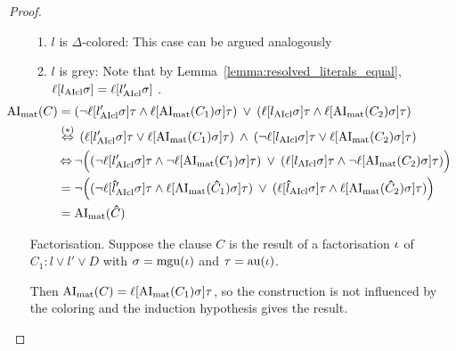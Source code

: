 \documentclass[,%
	draft=false,%
	numbers=noendperiod
	11pt,
	a4paper,
	oneside,%
	openany,
]{memoir}
\begin{document}
\begin{proof}
\begin{itemize}
\begin{enumerate}
				\item $l$ is $\Delta$-colored:
					This case can be argued analogously

				\item $l$ is grey:
					Note that by Lemma~\ref{lemma:resolved_literals_equal}, $\ell[l_{\operatorname{AIcl}}\sigma] = \ell[l'_{\operatorname{AIcl}}\sigma]$ \markB.
					\begin{align*}
						\hspace*{\dimexpr-\leftmargini-\leftmarginii}
						\AImat(C) &=
						(\lnot {\lifboth{l'\fromclause\sigma}}\tau \land \lifboth{\AImat(C_1)\sigma}\tau) \spam\lor 
						(\lifboth{l\fromclause\sigma}\tau \land \lifboth{\AImat(C_2)\sigma}\tau)\\
						&\stackrel{\markB}{\semiff}\,
						({\lifboth{l'\fromclause\sigma}}\tau \lor \lifboth{\AImat(C_1)\sigma}\tau) \spam\land 
						(\lnot \lifboth{l\fromclause\sigma}\tau \lor \lifboth{\AImat(C_2)\sigma}\tau)\\
						&\semiff \lnot \Big( (\lnot {\lifboth{l'\fromclause\sigma}}\tau \land \lnot \lifboth{\AImat(C_1)\sigma}\tau) \spam\lor 
						(\lifboth{l\fromclause\sigma}\tau \land \lnot\lifboth{\AImat(C_2)\sigma}\tau) \Big) \\
						&=\lnot \Big( (\lnot {\lifboth{\bhat l'\fromclause\sigma}}\tau \land \lifboth{\AImat(\bhat C_1)\sigma}\tau) \spam\lor 
						(\lifboth{\bhat l\fromclause\sigma}\tau \land \lifboth{\AImat(\bhat C_2)\sigma}\tau) \Big)\\
						& = \AImat(\bhat C) 
					\end{align*}


			\end{enumerate}



		\item[Factorisation.]
			Suppose the clause $C$ is the result of a factorisation $\iota$ of $C_1: l \lor l' \lor D$ 
			with $\sigma = \operatorname{mgu}(\iota)$ and $\tau = \operatorname{au}(\iota)$.

			Then $\operatorname{AI}_\mathrm{mat}(C) = \ell[\operatorname{AI}_\mathrm{mat}(C_1)\sigma]\tau$, so the construction is not influenced by the coloring and the induction hypothesis gives the result.
			\qedhere
	\end{itemize}
\end{proof}
\end{document}
